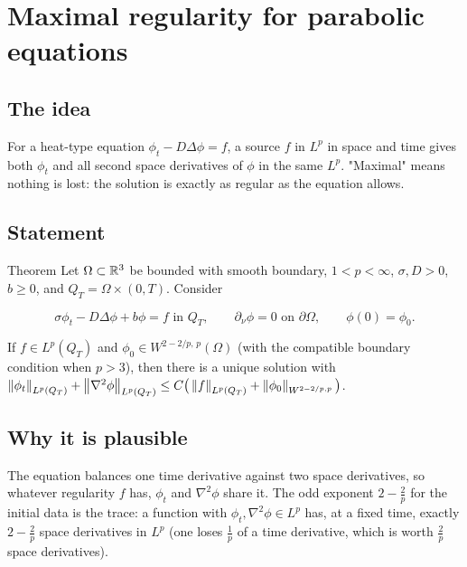 
\section{Maximal regularity for parabolic equations}\label{p:parabolic-regularity}


\subsection*{The idea}

For a heat-type equation $\phi_t - D\Delta\phi = f$, a source $f$ in $L^p$ in space and time gives both $\phi_t$ and all second space derivatives of $\phi$ in the same $L^p$. "Maximal" means nothing is lost: the solution is exactly as regular as the equation allows.

\subsection*{Statement}

\begin{thmbox}{Theorem}
%
Let $\Omega\subset\mathbb{R}^3$ be bounded with smooth boundary, $1< p< \infty$, $\sigma, D> 0$, $b\ge0$, and $Q_T=\Omega\times(0,T)$. Consider

\[ \sigma\phi_t - D\Delta\phi + b\phi = f \text{ in } Q_T,\qquad \partial_\nu\phi = 0 \text{ on } \partial\Omega,\qquad \phi(0)=\phi_0. \]

If $f\in L^p(Q_T)$ and $\phi_0\in W^{2-2/p,\,p}(\Omega)$ (with the compatible boundary condition when $p> 3$), then there is a unique solution with $\left\lVert \phi_t\right\rVert_{L^p(Q_T)}+\left\lVert \nabla^2\phi\right\rVert_{L^p(Q_T)}\le C\big(\left\lVert f\right\rVert_{L^p(Q_T)}+\left\lVert \phi_0\right\rVert_{W^{2-2/p,p}}\big)$.
\end{thmbox}

\subsection*{Why it is plausible}

The equation balances one time derivative against two space derivatives, so whatever regularity $f$ has, $\phi_t$ and $\nabla^2\phi$ share it. The odd exponent $2-\frac2p$ for the initial data is the trace: a function with $\phi_t,\nabla^2\phi\in L^p$ has, at a fixed time, exactly $2-\frac2p$ space derivatives in $L^p$ (one loses $\frac1p$ of a time derivative, which is worth $\frac2p$ space derivatives).

